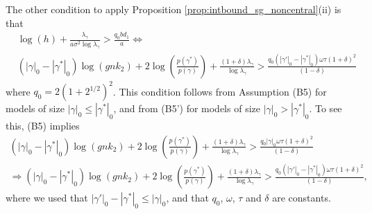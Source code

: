 The other condition to apply Proposition \ref{prop:intbound_sg_noncentral}(ii) is that
\begin{align}
& \log(h) + \frac{\lambda_\gamma}{a \sigma^2 \log \lambda_\gamma} > \frac{q_0bd_1}{a}
\Leftrightarrow
\nonumber \\
& (|\gamma|_0 - |\gamma^*|_0) \log(g n k_2) + 2 \log\left( \frac{p(\gamma^*)}{p(\gamma)} \right)
+ \frac{(1 + \delta) \lambda_\gamma}{\log \lambda_\gamma} > \frac{q_0 (|\gamma'|_0 - |\gamma^*|_0) \omega \tau (1+\delta)^2}{(1-\delta)}
\nonumber
\end{align}
where $q_0= 2(1+2^{1/2})^2$. This condition follows from Assumption (B5) for models of size $|\gamma|_0 \leq |\gamma^*|_0$, and from (B5') for models of size $|\gamma|_0 > |\gamma^*|_0$.
To see this, (B5) implies
\begin{align}
 (|\gamma|_0 - |\gamma^*|_0) \log(g n k_2) + 2 \log\left( \frac{p(\gamma^*)}{p(\gamma)} \right)
+ \frac{(1 + \delta) \lambda_\gamma}{\log \lambda_\gamma} > \frac{q_0 |\gamma|_0 \omega \tau (1+\delta)^2}{(1-\delta)}
\nonumber \\
\Rightarrow (|\gamma|_0 - |\gamma^*|_0) \log(g n k_2) + 2 \log\left( \frac{p(\gamma^*)}{p(\gamma)} \right)
+ \frac{(1 + \delta) \lambda_\gamma}{\log \lambda_\gamma} > \frac{q_0 (|\gamma'|_0 - |\gamma^*|_0) \omega \tau (1+\delta)^2}{(1-\delta)},
\nonumber
\end{align}
where we used that $|\gamma'|_0-|\gamma^*|_0 \leq |\gamma|_0$, and that $q_0$, $\omega$, $\tau$ and $\delta$ are constants.

